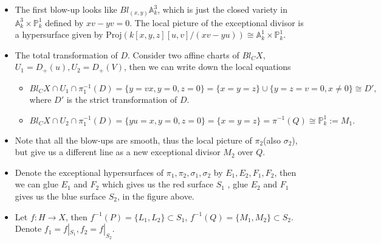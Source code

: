 \documentclass[../main.tex]{subfiles}
\begin{document}
\begin{example}
\begin{itemize}
\item The first blow-up looks like $Bl_{(x,y)}\mathbb{A}_{k}^{3}$, which is just the closed variety in $\mathbb{A}_{k}^{3}\times \mathbb{P}_{k}^{1}$ defined by $xv-yv=0$. The local picture of the exceptional divisor is a hypersurface given by  $\mathrm{Proj}(k[x,y,z][u,v]/(xv-yu))\cong \mathbb{A}_{k}^{1}\times \mathbb{P}_{k}^{1}$.
\item The total transformation of $D$. Consider two affine charts of $Bl_{C}X$, $U_{1}=D_{+}(u), U_{2}=D_{+}(V)$, then we can write down the local equations 
\begin{itemize}
\item $$Bl_{C}X\cap U_{1}\cap \pi_{1}^{-1}(D)=\{y=vx, y=0,z=0\}= \{x=y=z\}\cup \{y=z=v=0,x\neq 0\}\cong D',$$ where $D'$ is the strict transformation of $D$.
\item $$Bl_{C}X\cap U_{2}\cap \pi_{1}^{-1}(D)=\{yu=x, y=0,z=0\}= \{x=y=z\}=\pi^{-1}(Q)\cong \mathbb{P}_{k}^{1}:=M_{1}.$$
\end{itemize}
\item Note that all the blow-ups are smooth, thus the local picture of $\pi_{2}$(also $\sigma_{2}$), but give us a different line as a new exceptional divisor $M_{2}$ over $Q$. 
\item Denote the exceptional hypersurfaces of $\pi_{1},\pi_{2}, \sigma_{1},\sigma_{2}$ by $E_{1}, E_{2}, F_{1}, F_{2}$, then we can glue $E_{1}$ and $F_{2}$ which gives us the red surface $S_{1}$ , glue $E_{2}$ and $F_{1}$ gives us the blue surface $S_{2}$, in the figure above.
\item Let $f:H\rightarrow X$, then $f^{-1}(P)=\{L_{1}, L_{2}\}\subset S_{1}$, $f^{-1}(Q)=\{M_{1}, M_{2}\}\subset S_{2}.$ Denote $f_{1}=f|_{S_{1}}, f_{2}=f|_{S_{2}}.$


\end{itemize}


\end{example}
\end{document}
